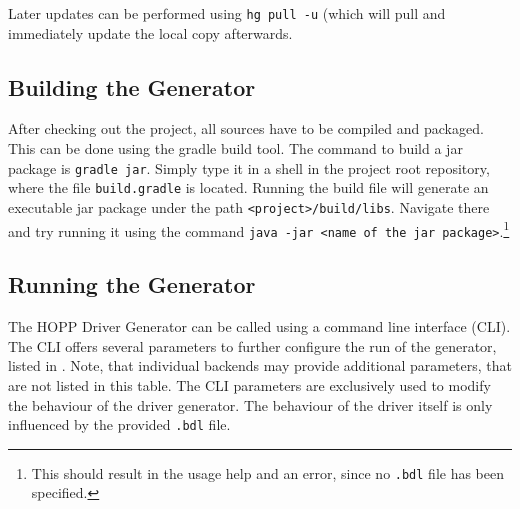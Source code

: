 \documentclass{report}
\begin{document}
Later updates can be performed using \texttt{hg pull -u} (which will pull and immediately update the local copy afterwards.
%
%
%
%
%
%
%

\subsection{Building the Generator}
After checking out the project, all sources have to be compiled and packaged. This can be done using the gradle build tool. The command to build a jar package is \texttt{gradle jar}. Simply type it in a shell in the project root repository, where the file \texttt{build.gradle} is located. Running the build file will generate an executable jar package under the path \texttt{<project>/build/libs}. Navigate there and try running it using the command \texttt{java -jar <name of the jar package>}.\footnote{This should result in the usage help and an error, since no \texttt{.bdl} file has been specified.}

\subsection{Running the Generator}
The HOPP Driver Generator can be called using a command line interface (CLI). The CLI offers several parameters to further configure the run of the generator, listed in . Note, that individual backends may provide additional parameters, that are not listed in this table. The CLI parameters are exclusively used to modify the behaviour of the driver generator. The behaviour of the driver itself is only influenced by the provided \texttt{.bdl} file.
\end{document}
